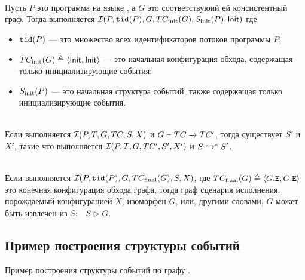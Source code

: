 \begin{lemma}
  \label{lm-apdx:simstart}
  \quad\\
  Пусть $P$ это программа на языке \LLANG,
  а $G$ это соответствуюий ей \IMM консистентный граф.
  Тогда выполняется $\mathcal{I}(P, {\mathtt{tid}}(P), G, TC_{\mathrm{init}}({G}), S_{\rm init}(P), {\mathsf{Init}})$ где
  \begin{itemize}
    \item ${\mathtt{tid}}(P)$ --- это множество всех идентификаторов потоков программы $P$;
    \item $TC_{\mathrm{init}}({G}) \triangleq \langle {\mathsf{Init}}, {\mathsf{Init}} \rangle$ --- это начальная конфигурация обхода,
      содержащая только инициализирующие события;
    \item $S_{\rm init}(P)$ --- это начальная структура событий,
      также содержащая только инициализирующие события.
  \end{itemize}
\end{lemma}

\begin{lemma}
  \label{lm-apdx:simstep}
  \quad\\
  Если выполняется $\mathcal{I}(P, T, G, TC, S, X)$ и ${G \vdash TC \xrightarrow{} TC'}$,
  тогда существует $S'$ и $X'$, такие что выполняется
  $\mathcal{I}(P, T, G, TC', S', X')$ и $S \xhookrightarrow{}^* S'$.
\end{lemma}

\begin{lemma}
  \label{lm-apdx:simend}
  \quad\\
  Если выполняется $\mathcal{I}(P, {\mathtt{tid}}(P), G, TC_{\mathrm{final}}({G}), S, X)$,
  где $TC_{\mathrm{final}}({G}) \triangleq \langle G.{\mathtt{E}}, G.{\mathtt{E}} \rangle$ это конечная
  конфигурация обхода графа, тогда граф сценария исполнения,
  порождаемый конфигурацией $X$, изоморфен $G$,
  или, другими словами, $G$ может быть извлечен из $S$:~~$S \rhd G$.
\end{lemma}

\todo{}

\subsection{Пример построения структуры событий}

Пример построения структуры событий по графу \IMM.
